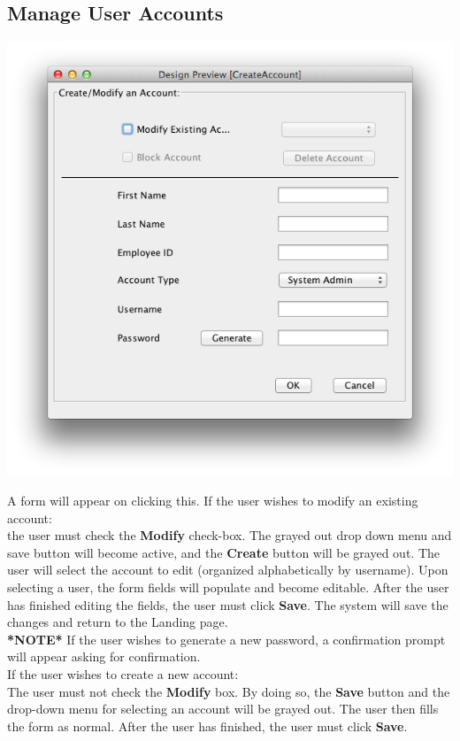 \documentclass{article}
\begin{document}
\subsection{Manage User Accounts}
\centerline{\includegraphics[scale=0.55]{../images/UpdatedUIScreens/CreateAccount.png}}
\label{manageAccts}
A form will appear on clicking this. 
If the user wishes to modify an existing account: \\
the user must check the \textbf{Modify} check-box. The grayed out drop down menu and
save button will become active, and the \textbf{Create} button will be grayed out.
The user will select the account to edit (organized alphabetically by username).
Upon selecting a user, the form fields will populate and become editable. After
the user has finished editing the fields, the user must click \textbf{Save}. The system
will save the changes and return to the Landing page. \\
\textbf{*NOTE*} If the user wishes to generate a new password, a confirmation
prompt will appear asking for confirmation.\\
If the user wishes to create a new account: \\
The user must not check the \textbf{Modify} box. By doing so, the \textbf{Save}
button and the drop-down menu for selecting an account will be grayed out.
The user then fills the form as normal. After the user has finished, the user
must click \textbf{Save}.
\clearpage
\end{document}
